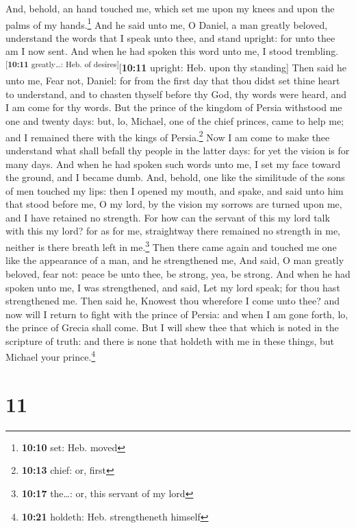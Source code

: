  And, behold, an hand touched me, which set me upon my
knees and upon the palms of my hands.\footnote{\textbf{10:10} set: Heb.
  moved}  And he said unto me, O Daniel, a man greatly
beloved, understand the words that I speak unto thee, and stand upright:
for unto thee am I now sent. And when he had spoken this word unto me, I
stood trembling.\textsuperscript{{[}\textbf{10:11} greatly\ldots: Heb.
of desires{]}}{[}\textbf{10:11} upright: Heb. upon thy standing{]}
 Then said he unto me, Fear not, Daniel: for from the
first day that thou didst set thine heart to understand, and to chasten
thyself before thy God, thy words were heard, and I am come for thy
words.  But the prince of the kingdom of Persia withstood
me one and twenty days: but, lo, Michael, one of the chief princes, came
to help me; and I remained there with the kings of Persia.\footnote{\textbf{10:13}
  chief: or, first}  Now I am come to make thee
understand what shall befall thy people in the latter days: for yet the
vision is for many days.  And when he had spoken such
words unto me, I set my face toward the ground, and I became dumb.
 And, behold, one like the similitude of the sons of men
touched my lips: then I opened my mouth, and spake, and said unto him
that stood before me, O my lord, by the vision my sorrows are turned
upon me, and I have retained no strength.  For how can
the servant of this my lord talk with this my lord? for as for me,
straightway there remained no strength in me, neither is there breath
left in me.\footnote{\textbf{10:17} the\ldots: or, this servant of my
  lord}  Then there came again and touched me one like
the appearance of a man, and he strengthened me,  And
said, O man greatly beloved, fear not: peace be unto thee, be strong,
yea, be strong. And when he had spoken unto me, I was strengthened, and
said, Let my lord speak; for thou hast strengthened me. 
Then said he, Knowest thou wherefore I come unto thee? and now will I
return to fight with the prince of Persia: and when I am gone forth, lo,
the prince of Grecia shall come.  But I will shew thee
that which is noted in the scripture of truth: and there is none that
holdeth with me in these things, but Michael your prince.\footnote{\textbf{10:21}
  holdeth: Heb. strengtheneth himself}

\hypertarget{section-10}{%
\section{11}\label{section-10}}

